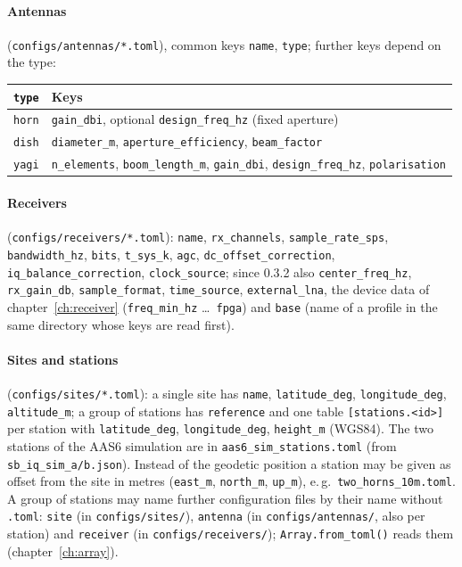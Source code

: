 \paragraph*{Antennas} (\texttt{configs/antennas/*.toml}), common keys
\texttt{name}, \texttt{type}; further keys depend on the type:
\begin{center}
\begin{tabularx}{\linewidth}{@{}lL@{}}
\toprule
\texttt{type} & Keys \\
\midrule
\texttt{horn} & \texttt{gain\_dbi}, optional \texttt{design\_freq\_hz} (fixed aperture) \\
\texttt{dish} & \texttt{diameter\_m}, \texttt{aperture\_efficiency}, \texttt{beam\_factor} \\
\texttt{yagi} & \texttt{n\_elements}, \texttt{boom\_length\_m}, \texttt{gain\_dbi},
                \texttt{design\_freq\_hz}, \texttt{polarisation} \\
\bottomrule
\end{tabularx}
\end{center}

\paragraph*{Receivers} (\texttt{configs/receivers/*.toml}):
\texttt{name}, \texttt{rx\_channels}, \texttt{sample\_rate\_sps},
\texttt{bandwidth\_hz}, \texttt{bits}, \texttt{t\_sys\_k}, \texttt{agc},
\texttt{dc\_offset\_correction}, \texttt{iq\_balance\_correction},
\texttt{clock\_source}; since 0.3.2 also \texttt{center\_freq\_hz},
\texttt{rx\_gain\_db}, \texttt{sample\_format}, \texttt{time\_source},
\texttt{external\_lna}, the device data of chapter~\ref{ch:receiver}
(\texttt{freq\_min\_hz} \dots\ \texttt{fpga}) and \texttt{base} (name of a
profile in the same directory whose keys are read first).

\paragraph*{Sites and stations} (\texttt{configs/sites/*.toml}): a single
site has \texttt{name}, \texttt{latitude\_deg}, \texttt{longitude\_deg},
\texttt{altitude\_m}; a group of stations has \texttt{reference} and one
table \texttt{[stations.<id>]} per station with \texttt{latitude\_deg},
\texttt{longitude\_deg}, \texttt{height\_m} (WGS84). The two stations of
the AAS6 simulation are in \texttt{aas6\_sim\_stations.toml}
(from \texttt{sb\_iq\_sim\_a/b.json}).
Instead of the geodetic position a station may be given as offset from
the site in metres (\texttt{east\_m}, \texttt{north\_m}, \texttt{up\_m}),
e.\,g.\ \texttt{two\_horns\_10m.toml}. A group of stations may name
further configuration files by their name without \texttt{.toml}:
\texttt{site} (in \texttt{configs/sites/}), \texttt{antenna} (in
\texttt{configs/antennas/}, also per station) and \texttt{receiver} (in
\texttt{configs/receivers/}); \texttt{Array.from\_toml()} reads them
(chapter~\ref{ch:array}).

